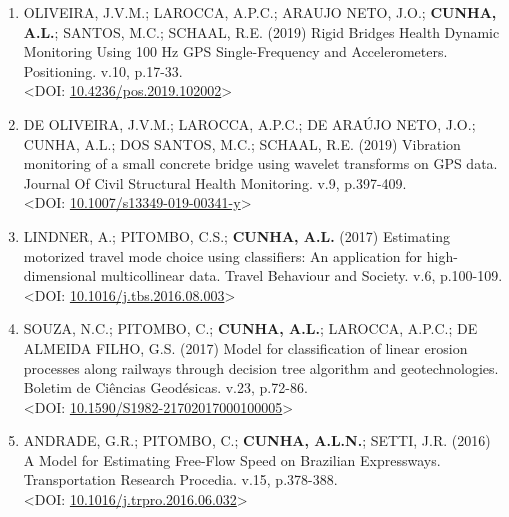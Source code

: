 \documentclass[
  brazilian,
  11pt,
  a4paper,
]{article}
\begin{document}
\begin{enumerate}
  PIANUCCI, M.N.; PITOMBO, C.S.; \textbf{CUNHA, A.L.}; LIMA SEGANTINE,
  P.C. (2019) Forecasting household travel demand through a sequential
  method based on synthetic population and artificial neural networks.
  Transportes (Rio de Janeiro). v.27, p.1-23.\\
  \textless DOI:
  \href{https://doi.org/10.14295/transportes.v27i4.1409}{10.14295/transportes.v27i4.1409}\textgreater{}
\item
  OLIVEIRA, J.V.M.; LAROCCA, A.P.C.; ARAUJO NETO, J.O.; \textbf{CUNHA,
  A.L.}; SANTOS, M.C.; SCHAAL, R.E. (2019) Rigid Bridges Health Dynamic
  Monitoring Using 100 Hz GPS Single-Frequency and Accelerometers.
  Positioning. v.10, p.17-33.\\
  \textless DOI:
  \href{https://doi.org/10.4236/pos.2019.102002}{10.4236/pos.2019.102002}\textgreater{}
\item
  DE OLIVEIRA, J.V.M.; LAROCCA, A.P.C.; DE ARAÚJO NETO, J.O.; CUNHA,
  A.L.; DOS SANTOS, M.C.; SCHAAL, R.E. (2019) Vibration monitoring of a
  small concrete bridge using wavelet transforms on GPS data. Journal Of
  Civil Structural Health Monitoring. v.9, p.397-409.\\
  \textless DOI:
  \href{https://doi.org/10.1007/s13349-019-00341-y}{10.1007/s13349-019-00341-y}\textgreater{}
\item
  LINDNER, A.; PITOMBO, C.S.; \textbf{CUNHA, A.L.} (2017) Estimating
  motorized travel mode choice using classifiers: An application for
  high-dimensional multicollinear data. Travel Behaviour and Society.
  v.6, p.100-109.\\
  \textless DOI:
  \href{https://doi.org/10.1016/j.tbs.2016.08.003}{10.1016/j.tbs.2016.08.003}\textgreater{}
\item
  SOUZA, N.C.; PITOMBO, C.; \textbf{CUNHA, A.L.}; LAROCCA, A.P.C.; DE
  ALMEIDA FILHO, G.S. (2017) Model for classification of linear erosion
  processes along railways through decision tree algorithm and
  geotechnologies. Boletim de Ciências Geodésicas. v.23, p.72-86.\\
  \textless DOI:
  \href{https://doi.org/10.1590/S1982-21702017000100005}{10.1590/S1982-21702017000100005}\textgreater{}
\item
  ANDRADE, G.R.; PITOMBO, C.; \textbf{CUNHA, A.L.N.}; SETTI, J.R. (2016)
  A Model for Estimating Free-Flow Speed on Brazilian Expressways.
  Transportation Research Procedia. v.15, p.378-388.\\
  \textless DOI:
  \href{https://doi.org/10.1016/j.trpro.2016.06.032}{10.1016/j.trpro.2016.06.032}\textgreater{}

\end{enumerate}
\end{document}
